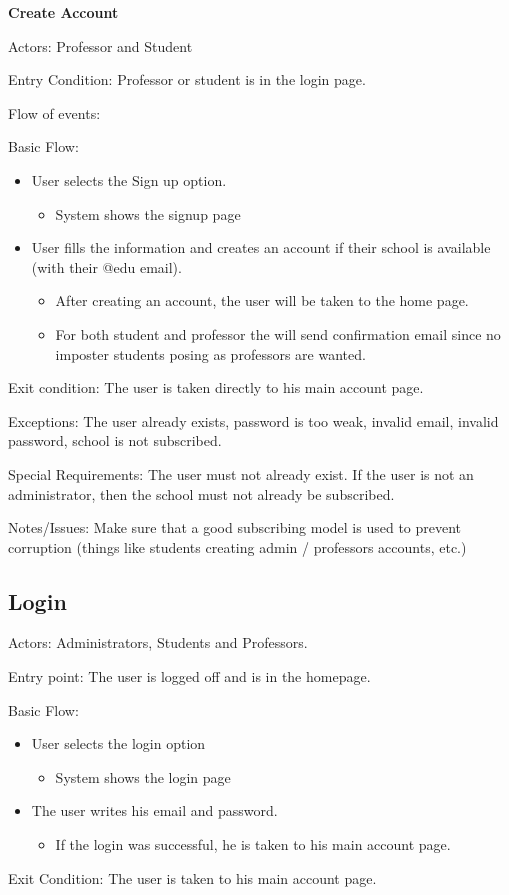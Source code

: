\textbf{Create Account}

Actors: Professor and Student

Entry Condition: Professor or student is in the login page.

Flow of events:

Basic Flow:

\begin{itemize}
\item User selects the Sign up option.
\begin{itemize}
\item System shows the signup page
\end{itemize}
\item User fills the information and creates an account if their school 
is available (with their @edu email).
\begin{itemize}
\item After creating an account, the user will be taken to the home 
page.
\item For both student and professor the will send confirmation email 
since no imposter students posing as professors are wanted.
\end{itemize}
\end{itemize}
Exit condition: The user is taken directly to his main account page.

Exceptions: The user already exists, password is too weak, invalid 
email, invalid password, school is not subscribed.

Special Requirements: The user must not already exist. If the user is 
not an administrator, then the school must not already be subscribed.

Notes/Issues: Make sure that a good subscribing model is used to prevent 
corruption (things like students creating admin / professors accounts, 
etc.)

\subsection*{Login}
Actors: Administrators, Students and Professors.

Entry point: The user is logged off and is in the homepage.

Basic Flow:

\begin{itemize}
\item User selects the login option
\begin{itemize}
\item System shows the login page
\end{itemize}
\item The user writes his email and password.
\begin{itemize}
\item If the login was successful, he is taken to his main account page. 

\end{itemize}
\end{itemize}
Exit Condition: The user is taken to his main account page.

